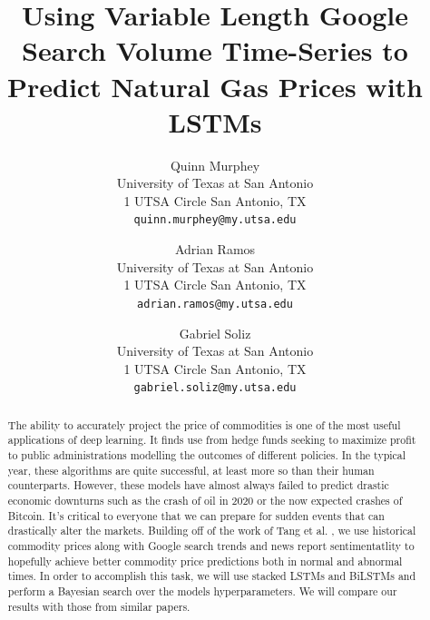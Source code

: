 \documentclass[final]{cvpr}
\begin{document}
\title{Using Variable Length Google Search Volume Time-Series to Predict Natural
    Gas Prices with LSTMs}


\author{Quinn Murphey\\
University of Texas at San Antonio\\
1 UTSA Circle San Antonio, TX\\
{\tt\small quinn.murphey@my.utsa.edu}
\and
Adrian Ramos\\
University of Texas at San Antonio\\
1 UTSA Circle San Antonio, TX\\
{\tt\small adrian.ramos@my.utsa.edu}

\and
Gabriel Soliz\\
University of Texas at San Antonio\\
1 UTSA Circle San Antonio, TX\\
{\tt\small gabriel.soliz@my.utsa.edu}
}

\maketitle


\begin{abstract}
    The ability to accurately project the price of commodities is one of the
    most useful applications of deep learning. It finds use from hedge funds
    seeking to maximize profit to public administrations modelling the outcomes
    of different policies. In the typical year, these algorithms are quite 
    successful, at least more so than their human counterparts. However, these
    models have almost always failed to predict drastic economic downturns such
    as the crash of oil in 2020 or the now expected crashes of Bitcoin.
    It’s critical to everyone that we can prepare for sudden events that can
    drastically alter the markets. Building off of the work of Tang et al.
    \cite{tang}, we use historical commodity prices along with Google
    search trends and news report sentimentatlity to hopefully achieve better
    commodity price predictions both in normal and abnormal times. In order
    to accomplish this task, we will use stacked LSTMs and BiLSTMs and perform a
    Bayesian search over the models hyperparameters. We will compare our results
    with those from similar papers.
\end{abstract}
\end{document}
